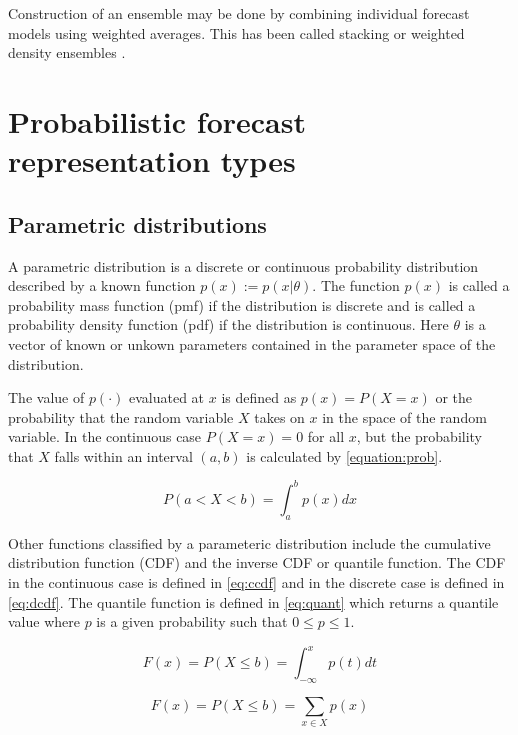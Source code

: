 \documentclass[11pt,notitlepage]{isuthesis}
\begin{document}
Construction of an ensemble may be done by combining individual forecast 
models using weighted averages. This has been called stacking 
\cite[]{wolpert1992stacked} or weighted density ensembles 
\cite[]{ray2018prediction}. 

\section{Probabilistic forecast representation types}
\subsection{Parametric distributions}
\label{section:pardist}
A parametric distribution is a discrete or continuous probability distribution 
described by a known function $p(x) := p(x|\theta)$. The function $p(x)$ is 
called a probability mass function (pmf) if the distribution is discrete and 
is called a probability density function
(pdf) if the distribution is continuous. Here $\theta$ is a vector of known or 
unkown parameters contained in the parameter space of the distribution. 

The value of $p(\cdot)$ evaluated at $x$ is defined as 
$p(x) = P(X = x)$ or the probability that the random variable $X$ takes
on $x$ in the space of the random variable. In the continuous case 
$P(X = x) = 0$ for all $x$, but the probability 
that $X$ falls within an interval $(a,b)$ is calculated by 
\eqref{equation:prob}.

\begin{equation}
\label{equation:prob}
  P(a < X < b) = \int_a^b p(x) dx
\end{equation}

Other functions classified by a parameteric distribution include the cumulative
distribution function (CDF) and the inverse CDF or quantile function. The CDF 
in the continuous case is defined in \eqref{eq:ccdf} and in the 
discrete case is defined in \eqref{eq:dcdf}.
The quantile function is defined in \eqref{eq:quant} which returns a quantile 
value where $p$ is a given probability such that $0\leq p \leq 1$.

\begin{equation}
\label{eq:ccdf}
  F(x) = P(X \leq b) = \int_{-\infty}^x p(t) dt
\end{equation}

\begin{equation}
\label{eq:dcdf}
  F(x) = P(X \leq b) = \sum_{x \in X} p(x)
\end{equation}
\end{document}
